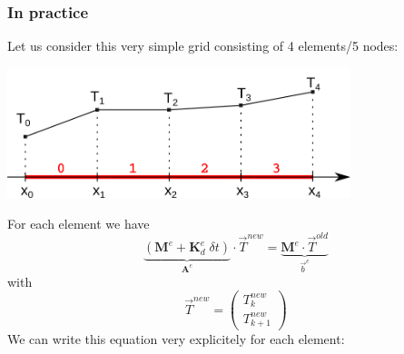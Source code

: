 \subsubsection{In practice}

Let us consider this very simple grid consisting of 4 elements/5 nodes:
\begin{center}
\includegraphics[width=10cm]{images/oneD/grid5}
\end{center}
For each element we have 
\[
\underbrace{( {\bm M}^e +  {\bm K}_d^e \; \delta t )}_{\bm A^{e}} \cdot {\vec T}^{new} =  \underbrace{{\bm M}^e \cdot  {\vec T}^{old} }_{\vec b^{e}}
\]
with 
\[
\vec{T}^{new}=
\left(
\begin{array}{c}
T_k^{new} \\ T_{k+1}^{new}
\end{array}
\right)
\]
We can write this equation very explicitely for each element:
